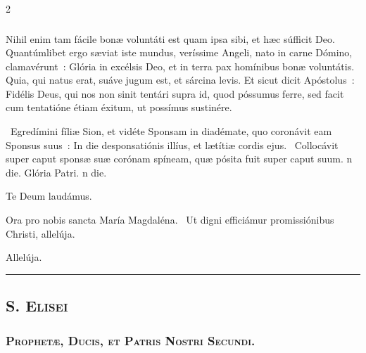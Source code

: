 \documentclass[9pt,twoside]{extarticle}
\begin{document}
\begin{multicols}{2}
{\subsubsection*{\center {}}
Nihil enim tam fácile bonæ voluntáti est quam ipsa sibi, et hæc súfficit Deo. Quantúmlibet ergo sæviat iste mundus, veríssime Angeli, nato in carne Dómino, clamavérunt~: Glória in excélsis Deo, et in terra pax homínibus bonæ voluntátis. Quia, qui natus erat, suáve jugum est, et sárcina levis. Et sicut dicit Apóstolus~: Fidélis Deus, qui nos non sinit tentári supra id, quod póssumus ferre, sed facit cum tentatióne étiam éxitum, ut possímus sustinére.

\begin{tightlist}{}
\item {}~Egredímini fíliæ Sion, et vidéte Sponsam in diadémate, quo coronávit eam Sponsus suus~: \textred{*} In die desponsatiónis illíus, et lætítiæ cordis ejus. ~Collocávit super caput sponsæ suæ corónam spíneam, quæ pósita fuit super caput suum. n die. Glória Patri. n die.
\item Te Deum laudámus.
\item {} Ora pro nobis sancta María Magdaléna. ~Ut digni efficiámur promissiónibus Christi, allelúja.
\end{tightlist}

\begin{tightlist}{}
\item {}
\item {} Allelúja.
\end{tightlist}

\begin{center}\textcolor{red}{\rule{\linewidth}{0.5pt}} \end{center}

\subsection*{\center {}}
\subsection*{\center \textsc{S. Elisei}}
\subsubsection*{\center \textsc{Prophetæ, Ducis, et Patris Nostri Secundi.}}
}
\end{multicols}
\end{document}
